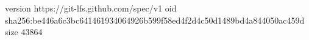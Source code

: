 version https://git-lfs.github.com/spec/v1
oid sha256:be446a6c3bc641461934064926b599f58ed4f2d4c50d1489bd4a844050ac459d
size 43864
